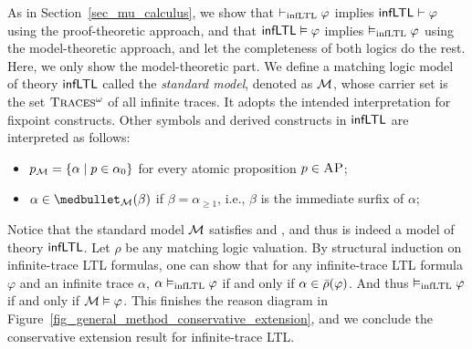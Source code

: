 \documentclass{amsart}
\begin{document}
%


As in Section~\ref{sec_mu_calculus}, we show
that
$\vdash_{\mathrm{infLTL}} \varphi$ implies $\mathsf{infLTL} \vdash \varphi$ using the proof-theoretic approach,
and that
$\mathsf{infLTL} \vDash \varphi$ implies $\vDash_{\mathrm{infLTL}}\varphi$ using the model-theoretic approach,
and let the completeness of both logics do the rest.
Here, we only show the model-theoretic part.
We define a matching logic model of theory $\mathsf{infLTL}$ called the \emph{standard model},
denoted as $\mathcal{M}$, whose carrier set is the set $\textsc{Traces$^\omega$}$ of all infinite traces.
It adopts the intended interpretation for fixpoint constructs.
Other symbols and derived constructs in $\mathsf{infLTL}$ are interpreted as follows:
\begin{itemize}
\item $p_{\mathcal{M}} = \{ \alpha \mid p \in \alpha_0 \}$ for every atomic proposition $p \in \textsc{AP}$;
\item $\alpha \in \snext_\MM(\beta)$ if $\beta = \alpha_{\ge 1}$, i.e.,
      $\beta$ is the immediate surfix of $\alpha$;
\end{itemize}
Notice that the standard model $\mathcal{M}$ satisfies \Lin and \Fin, and thus is indeed a model
of theory $\mathsf{infLTL}$.
Let $\rho$ be any matching logic valuation.
By structural induction on infinite-trace LTL formulas,
one can show that for any infinite-trace LTL formula $\varphi$ and an infinite trace $\alpha$,
$\alpha \vDash_{\mathrm{infLTL}} \varphi$ if and only if $\alpha \in \bar{\rho}(\varphi)$.
And thus $\vDash_{\mathrm{infLTL}} \varphi$ if and only if $\mathcal{M} \vDash \varphi$.
This finishes the reason diagram in Figure~\ref{fig_general_method_conservative_extension},
and we conclude the conservative extension result for infinite-trace LTL.
\end{document}
